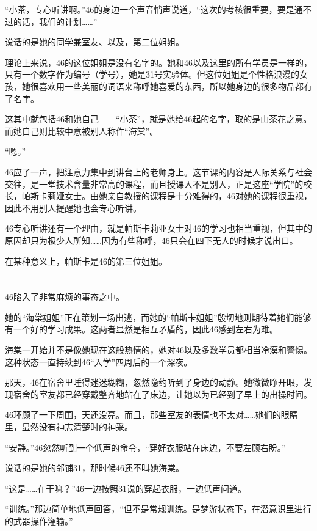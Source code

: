 “小茶，专心听讲啊。”46的身边一个声音悄声说道，“这次的考核很重要，要是通不过的话，我们的计划……”

说话的是她的同学兼室友、以及，第二位姐姐。

理论上来说，46的这位姐姐是没有名字的。她和46以及这里的所有学员是一样的，只有一个数字作为编号（学号），她是31号实验体。但这位姐姐是个性格浪漫的女孩，她很喜欢用一些美丽的词语来称呼她喜爱的东西，所以她身边的很多物品都有了名字。

这其中就包括46和她自己——“小茶”，就是她给46起的名字，取的是山茶花之意。而她自己则比较中意被别人称作“海棠”。

“嗯。”

46应了一声，把注意力集中到讲台上的老师身上。这节课的内容是人际关系与社会交往，是一堂技术含量非常高的课程，而且授课人不是别人，正是这座“学院”的校长，帕斯卡莉娅女士。由她亲自教授的课程是十分难得的，46对她的课程很重视，因此不用别人提醒她也会专心听讲。

46专心听讲还有一个理由，就是帕斯卡莉亚女士对46的学习也相当重视，但其中的原因却只为极少人所知……因为有些称呼，46只会在四下无人的时候才说出口。

在某种意义上，帕斯卡是46的第三位姐姐。

\section*{}

46陷入了非常麻烦的事态之中。

她的“海棠姐姐”正在策划一场出逃，而她的“帕斯卡姐姐”殷切地则期待着她们能够有一个好的学习成果。这两者显然是相互矛盾的，因此46感到左右为难。

海棠一开始并不是像她现在这般热情的，她对46以及多数学员都相当冷漠和警惕。这种状态一直持续到46“入学”四周后的一个深夜。

那天，46在宿舍里睡得迷迷糊糊，忽然隐约听到了身边的动静。她微微睁开眼，发现宿舍的室友都已经穿戴整齐地站在了床边，让她以为已经到了早上的出操时间。

46环顾了一下周围，天还没亮。而且，那些室友的表情也不太对……她们的眼睛里，显然没有神志清楚时的神采。

“安静。”46忽然听到一个低声的命令，“穿好衣服站在床边，不要左顾右盼。”

说话的是她的邻铺31，那时候46还不叫她海棠。

“这是……在干嘛？”46一边按照31说的穿起衣服，一边低声问道。

“训练。”那边简单地低声回答，“但不是常规训练。是梦游状态下，在潜意识里进行的武器操作灌输。”

